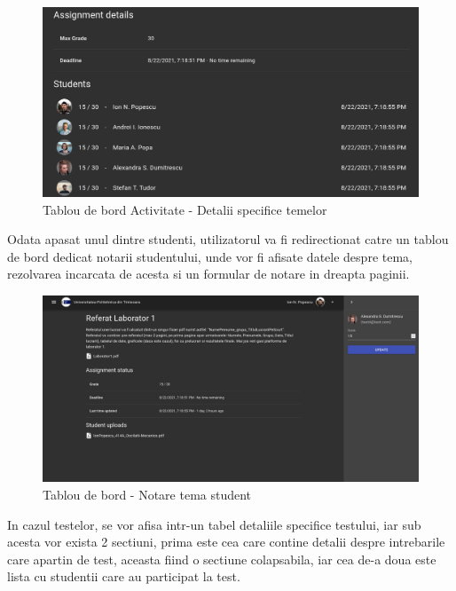\documentclass[12pt, a4paper, oneside, romanian]{teza-upb}
\begin{document}
\begin{figure}[H]
\centering
\includegraphics*[width=\columnwidth]{tablou-de-bord-activitate-detalii-specifice-temelor}
\caption{Tablou de bord Activitate - Detalii specifice temelor}
\label{tablou-de-bord-activitate-detalii-specifice-temelor}
\end{figure}

Odata apasat unul dintre studenti, utilizatorul va fi redirectionat catre un tablou de bord dedicat notarii studentului, unde vor fi afisate datele despre tema, rezolvarea incarcata de acesta si un formular de notare in dreapta paginii.

\begin{figure}[H]
\centering
\includegraphics*[width=\columnwidth]{tablou-de-bord-notare-tema-student}
\caption{Tablou de bord - Notare tema student}
\label{tablou-de-bord-notare-tema-student}
\end{figure}

In cazul testelor, se vor afisa intr-un tabel detaliile specifice testului, iar sub acesta vor exista 2 sectiuni, prima este cea care contine detalii despre intrebarile care apartin de test, aceasta fiind o sectiune colapsabila, iar cea de-a doua este lista cu studentii care au participat la test.
\end{document}
